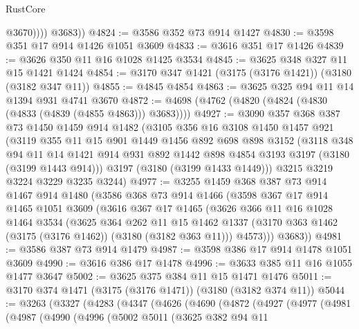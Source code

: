 \begin{lexlean}{RustCore}
\begin{coremodule}
                @3670))))
        @3683))
@4824 := @3586 @352 @73 @914 @1427
@4830 := @3598 @351 @17 @914 @1426 @1051 @3609
@4833 := @3616 @351 @17 @1426
@4839 := @3626 @350 @11 @16 @1028 @1425 @3534
@4845 := @3625 @348 @327 @11 @15 @1421 @1424
@4854 := @3170 @347 @1421 (@3175 (@3176 @1421)) (@3180 (@3182 @347 @11))
@4855 := @4845 @4854
@4863 := @3625 @325 @94 @11 @14 @1394 @931 @4741 @3670
@4872 := @4698 (@4762 (@4820 (@4824 (@4830 (@4833 (@4839 (@4855 @4863))) @3683))))
@4927 := @3090
    @357
    @368
    @387
    @73
    @1450
    @1459
    @914
    @1482
    (@3105
      @356
      @16
      @3108
      @1450
      @1457
      @921
      (@3119
        @355
        @11
        @15
        @901
        @1449
        @1456
        @892
        @698
        @898
        @3152
        (@3118
          @348
          @94
          @11
          @14
          @1421
          @914
          @931
          @892
          @1442
          @898
          @4854
          @3193
          @3197
          (@3180 (@3199 @1443 @914)))
        @3197
        (@3180 (@3199 @1433 @1449)))
      @3215
      @3219
      @3224
      @3229
      @3235
      @3244)
@4977 := @3255
    @1459
    @368
    @387
    @73
    @914
    @1467
    @914
    @1480
    (@3586
      @368
      @73
      @914
      @1466
      (@3598
        @367
        @17
        @914
        @1465
        @1051
        @3609
        (@3616
          @367
          @17
          @1465
          (@3626
            @366
            @11
            @16
            @1028
            @1464
            @3534
            (@3625
              @364
              @262
              @11
              @15
              @1462
              @1337
              (@3170 @363 @1462 (@3175 (@3176 @1462)) (@3180 (@3182 @363 @11)))
              @4573)))
        @3683))
@4981 := @3586 @387 @73 @914 @1479
@4987 := @3598 @386 @17 @914 @1478 @1051 @3609
@4990 := @3616 @386 @17 @1478
@4996 := @3633 @385 @11 @16 @1055 @1477 @3647
@5002 := @3625 @375 @384 @11 @15 @1471 @1476
@5011 := @3170 @374 @1471 (@3175 (@3176 @1471)) (@3180 (@3182 @374 @11))
@5044 := @3263
    (@3327
      (@4283
        (@4347
          (@4626
            (@4690
              (@4872
                (@4927
                  (@4977
                    (@4981
                      (@4987
                        (@4990
                          (@4996
                            (@5002
                              @5011
                              (@3625
                                @382
                                @94
                                @11

\end{coremodule}
\end{lexlean}
